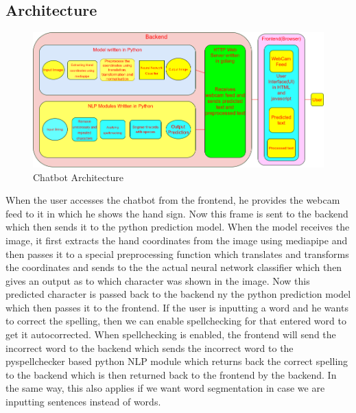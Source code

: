 \documentclass[12pt,a4paper]{report}
\begin{document}
\subsection{Architecture}
\begin{figure}[htbp]
	\centerline{\includegraphics[scale=0.4]{architecture.png}}
	\caption{Chatbot Architecture}
	\label{Architecture}
\end{figure}
When the user accesses the chatbot from the frontend, he provides the webcam feed to it in which he shows the hand sign. Now this frame is sent to the backend which then sends it to the python prediction model. When the model receives the image, it first extracts the hand coordinates from the image using mediapipe and then passes it to a special preprocessing function which translates and transforms the coordinates and sends to the the actual neural network classifier which then gives an output as to which character was shown in the image. Now this predicted character is passed back to the backend ny the python prediction model which then passes it to the frontend. If the user is inputting a word and he wants to correct the spelling, then we can enable spellchecking for that entered word to get it autocorrected. When spellchecking is enabled, the frontend will send the incorrect word to the backend which sends the incorrect word to the pyspellchecker based python NLP module which returns back the correct spelling to the backend which is then returned back to the frontend by the backend. In the same way, this also applies if we want word segmentation in case we are inputting sentences instead of words.
\end{document}
